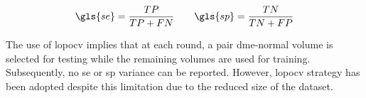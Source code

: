 \begin{align}
 \gls{se}  = \frac{TP}{TP+FN} \qquad \gls{sp} = \frac{TN}{TN+FP}
 \label{eq:sesp}
\end{align}

The use of \gls{lopocv} implies that at each round, a pair \gls{dme}-normal volume is selected for testing while the remaining volumes are used for training.
Subsequently, no \gls{se} or \gls{sp} variance can be reported.
However, \gls{lopocv} strategy has been adopted despite this limitation due to the reduced size of the dataset.

